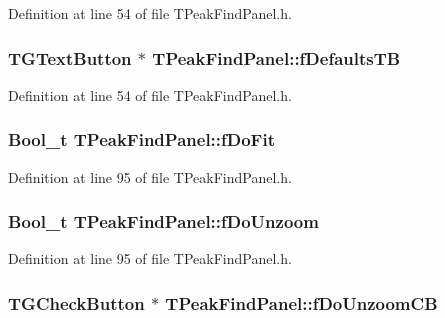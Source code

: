 Definition at line 54 of file TPeakFindPanel.h.

\subsubsection[{fDefaultsTB}]{\setlength{\rightskip}{0pt plus 5cm}TGTextButton $\ast$ {\bf TPeakFindPanel::fDefaultsTB}\hspace{0.3cm}{\ttfamily  [private]}}\label{classTPeakFindPanel_a9b6f02b821aef2b76c3e3dc5cccca726}


Definition at line 54 of file TPeakFindPanel.h.

\subsubsection[{fDoFit}]{\setlength{\rightskip}{0pt plus 5cm}Bool\_\-t {\bf TPeakFindPanel::fDoFit}\hspace{0.3cm}{\ttfamily  [protected]}}\label{classTPeakFindPanel_a0d1c1e970b53cbae773a3fca98434573}


Definition at line 95 of file TPeakFindPanel.h.

\subsubsection[{fDoUnzoom}]{\setlength{\rightskip}{0pt plus 5cm}Bool\_\-t {\bf TPeakFindPanel::fDoUnzoom}\hspace{0.3cm}{\ttfamily  [protected]}}\label{classTPeakFindPanel_aa389f7df82bc4271586f596129ee7616}


Definition at line 95 of file TPeakFindPanel.h.

\subsubsection[{fDoUnzoomCB}]{\setlength{\rightskip}{0pt plus 5cm}TGCheckButton $\ast$ {\bf TPeakFindPanel::fDoUnzoomCB}\hspace{0.3cm}{\ttfamily  [private]}}\label{classTPeakFindPanel_aeebf59829a320058c0293accf850b732}


